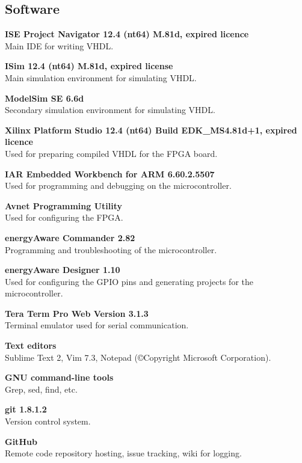 \subsection{Software}
\begin{description}
    \item{\textbf{ISE Project Navigator 12.4 (nt64) M.81d, expired licence}} \\
        Main IDE for writing VHDL.
    \item{\textbf{ISim 12.4 (nt64) M.81d, expired license}} \\
        Main simulation environment for simulating VHDL.
    \item{\textbf{ModelSim SE 6.6d}} \\
        Secondary simulation environment for simulating VHDL.
    \item{\textbf{Xilinx Platform Studio 12.4 (nt64) Build EDK\_MS4.81d+1, expired licence}} \\
        Used for preparing compiled VHDL for the FPGA board.
    \item{\textbf{IAR Embedded Workbench for ARM 6.60.2.5507}} \\
        Used for programming and debugging on the microcontroller.
    \item{\textbf{Avnet Programming Utility}} \\
        Used for configuring the FPGA.
    \item{\textbf{energyAware Commander 2.82}} \\
        Programming and troubleshooting of the microcontroller.
    \item{\textbf{energyAware Designer 1.10}} \\
        Used for configuring the GPIO pins and generating projects for the microcontroller.
    \item{\textbf{Tera Term Pro Web Version 3.1.3}} \\
        Terminal emulator used for serial communication.
    \item{\textbf{Text editors}} \\
        Sublime Text 2, Vim 7.3, Notepad (©Copyright Microsoft Corporation).
    \item{\textbf{GNU command-line tools}} \\
        Grep, sed, find, etc.
    \item{\textbf{git 1.8.1.2}} \\
        Version control system.
    \item{\textbf{GitHub}} \\
        Remote code repository hosting, issue tracking, wiki for logging.
\end{description}

